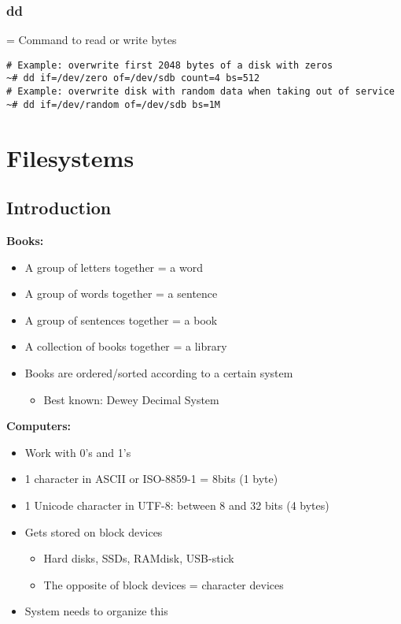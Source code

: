 \documentclass{article}
\begin{document}
\subsubsection{dd}

= Command to read or write bytes

\begin{verbatim}
# Example: overwrite first 2048 bytes of a disk with zeros
~# dd if=/dev/zero of=/dev/sdb count=4 bs=512
# Example: overwrite disk with random data when taking out of service
~# dd if=/dev/random of=/dev/sdb bs=1M
\end{verbatim}

\section{Filesystems}

\subsection{Introduction}

\textbf{Books:}

\begin{itemize}
    \item A group of letters together = a word
    \item A group of words together = a sentence
    \item A group of sentences together = a book
    \item A collection of books together = a library
    \item Books are ordered/sorted according to a certain system
    \begin{itemize}
        \item Best known: Dewey Decimal System
    \end{itemize}
\end{itemize}

\textbf{Computers:}

\begin{itemize}
    \item Work with 0's and 1's
    \item 1 character in ASCII or ISO-8859-1 = 8bits (1 byte)
    \item 1 Unicode character in UTF-8: between 8 and 32 bits (4 bytes)
    \item Gets stored on block devices
    \begin{itemize}
        \item Hard disks, SSDs, RAMdisk, USB-stick
        \item The opposite of block devices = character devices 
    \end{itemize}
    \item System needs to organize this
\end{itemize}
\end{document}
